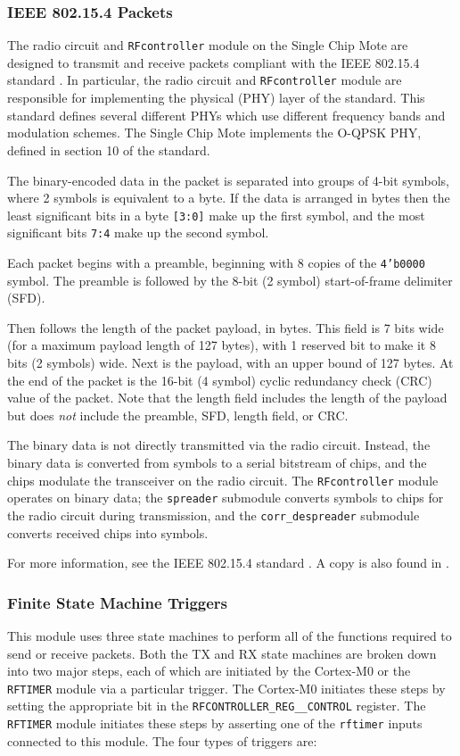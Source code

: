 \subsubsection{IEEE 802.15.4 Packets}
The radio circuit and \texttt{RFcontroller} module on the Single Chip Mote are designed to transmit and receive packets compliant with the IEEE 802.15.4 standard \cite{15-4-standard}. In particular, the radio circuit and \texttt{RFcontroller} module are responsible for implementing the physical (PHY) layer of the standard. This standard defines several different PHYs which use different frequency bands and modulation schemes. The Single Chip Mote implements the O-QPSK PHY, defined in section 10 of the standard.

The binary-encoded data in the packet is separated into groups of 4-bit symbols, where 2 symbols is equivalent to a byte. If the data is arranged in bytes then the least significant bits in a byte \texttt{[3:0]} make up the first symbol, and the most significant bits \texttt{7:4} make up the second symbol.

Each packet begins with a preamble, beginning with 8 copies of the \texttt{4'b0000} symbol. The preamble is followed by the 8-bit (2 symbol) start-of-frame delimiter (SFD).

Then follows the length of the packet payload, in bytes. This field is 7 bits wide (for a maximum payload length of 127 bytes), with 1 reserved bit to make it 8 bits (2 symbols) wide. Next is the payload, with an upper bound of 127 bytes. At the end of the packet is the 16-bit (4 symbol) cyclic redundancy check (CRC) value of the packet. Note that the length field includes the length of the payload but does \textit{not} include the preamble, SFD, length field, or CRC.

The binary data is not directly transmitted via the radio circuit. Instead, the binary data is converted from symbols to a serial bitstream of chips, and the chips modulate the transceiver on the radio circuit. The \texttt{RFcontroller} module operates on binary data; the \texttt{spreader} submodule converts symbols to chips for the radio circuit during transmission, and the \texttt{corr\_despreader} submodule converts received chips into symbols.

For more information, see the IEEE 802.15.4 standard \cite{15-4-standard}. A copy is also found in .

\subsubsection{Finite State Machine Triggers}
This module uses three state machines to perform all of the functions required to send or receive packets. Both the TX and RX state machines are broken down into two major steps, each of which are initiated by the Cortex-M0 or the \texttt{RFTIMER} module via a particular trigger. The Cortex-M0 initiates these steps by setting the appropriate bit in the \texttt{RFCONTROLLER\_REG\_\_CONTROL} register. The \texttt{RFTIMER} module initiates these steps by asserting one of the \texttt{rftimer} inputs connected to this module. The four types of triggers are:

